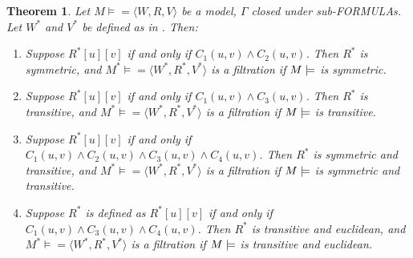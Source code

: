 \documentclass[10pt,a4paper]{article}
\makeatletter
\newcommand*{\olup}[1]{\MakeUppercase{#1}}
\theoremstyle{plain}
\newtheorem{thm}{Theorem}[section]
\theoremstyle{definition}
\theoremstyle{remark}
\newcommand*{\ollabel}[1]{\label{#1}}
\newcommand{\olref}{\@ifnextchar[{\olref@i}{\olref@final}}
\def\olref@i[#1]{\@ifnextchar[{\olref@ii}{\olref@final}}
\def\olref@ii[#1]{\@ifnextchar[{\olref@iii}{\olref@final}}
\def\olref@iii[#1]{\olref@final}
\def\olref@final#1{\ref{#1}}
\providecommand{\mModel}[2]{\ensuremath{#1 \models #2}}
\providecommand{\tuple}[1]{\langle #1 \rangle}
\makeatother
\begin{document}
\begin{thm}\ollabel{thm:more-filtrations}
  Let $\mModel{M} =\tuple{W,R,V}$ be a model, $\Gamma$ closed under
  sub-\olup{formula}s. Let $W^*$ and $V^*$ be defined as in
  \olref[fil]{defn:filtration}. Then:
  \begin{enumerate}
  \item Suppose $R^*[u][v]$ if and only if $C_1(u, v) \land
    C_2(u,v)$. Then $R^*$ is symmetric, and $\mModel{M^*} =
    \tuple{W^*,R^*,V^*}$ is a filtration if $\mModel{M}$ is symmetric.
  \item Suppose $R^*[u][v]$ if and only if $C_1(u, v)
    \land C_3(u,v)$. Then $R^*$ is transitive, and
    $\mModel{M^*}=\tuple{W^*,R^*,V^*}$ is a filtration if $\mModel{M}$
    is transitive.
  \item Suppose $R^*[u][v]$ if and only if $C_1(u, v) \land C_2(u,v)
    \land C_3(u,v) \land C_4(u,v)$. Then $R^*$ is symmetric and
    transitive, and $\mModel{M^*}=\tuple{W^*,R^*,V^*}$ is a filtration
    if $\mModel{M}$ is symmetric and transitive.
  \item Suppose $R^*$ is defined as $R^*[u][v]$ if and only if $C_1(u,
    v) \land C_3(u,v) \land C_4(u,v)$. Then $R^*$ is transitive and
    euclidean, and $\mModel{M^*}=\tuple{W^*,R^*,V^*}$ is a filtration
    if $\mModel{M}$ is transitive and euclidean.
  \end{enumerate}
\end{thm}
\end{document}
